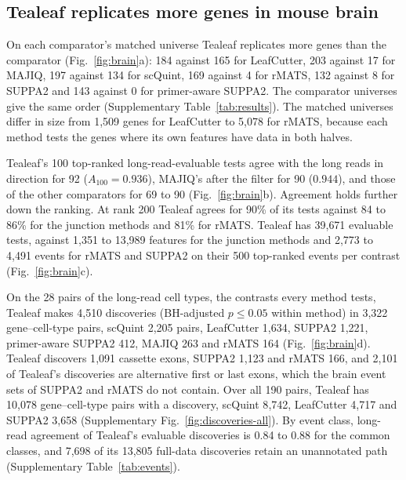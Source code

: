 \documentclass[11pt]{article}
\begin{document}
\subsection{Tealeaf replicates more genes in mouse brain}

On each comparator's matched universe Tealeaf replicates more genes than the comparator (Fig.~\ref{fig:brain}a): 184 against 165 for LeafCutter, 203 against 17 for MAJIQ, 197 against 134 for scQuint, 169 against 4 for rMATS, 132 against 8 for SUPPA2 and 143 against 0 for primer-aware SUPPA2. The comparator universes give the same order (Supplementary Table~\ref{tab:results}). The matched universes differ in size from 1{,}509 genes for LeafCutter to 5{,}078 for rMATS, because each method tests the genes where its own features have data in both halves.

Tealeaf's 100 top-ranked long-read-evaluable tests agree with the long reads in direction for 92 ($A_{100}=0.936$), MAJIQ's after the filter for 90 ($0.944$), and those of the other comparators for 69 to 90 (Fig.~\ref{fig:brain}b). Agreement holds further down the ranking. At rank 200 Tealeaf agrees for 90\% of its tests against 84 to 86\% for the junction methods and 81\% for rMATS. Tealeaf has 39{,}671 evaluable tests, against 1{,}351 to 13{,}989 features for the junction methods and 2{,}773 to 4{,}491 events for rMATS and SUPPA2 on their 500 top-ranked events per contrast (Fig.~\ref{fig:brain}c).

On the 28 pairs of the long-read cell types, the contrasts every method tests, Tealeaf makes 4{,}510 discoveries (BH-adjusted $p\le0.05$ within method) in 3{,}322 gene--cell-type pairs, scQuint 2{,}205 pairs, LeafCutter 1{,}634, SUPPA2 1{,}221, primer-aware SUPPA2 412, MAJIQ 263 and rMATS 164 (Fig.~\ref{fig:brain}d). Tealeaf discovers 1{,}091 cassette exons, SUPPA2 1{,}123 and rMATS 166, and 2{,}101 of Tealeaf's discoveries are alternative first or last exons, which the brain event sets of SUPPA2 and rMATS do not contain. Over all 190 pairs, Tealeaf has 10{,}078 gene--cell-type pairs with a discovery, scQuint 8{,}742, LeafCutter 4{,}717 and SUPPA2 3{,}658 (Supplementary Fig.~\ref{fig:discoveries-all}). By event class, long-read agreement of Tealeaf's evaluable discoveries is 0.84 to 0.88 for the common classes, and 7{,}698 of its 13{,}805 full-data discoveries retain an unannotated path (Supplementary Table~\ref{tab:events}).
\end{document}
